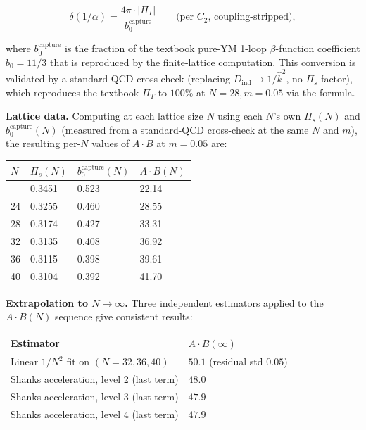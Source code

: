 \documentclass[
]{article}
\begin{document}
\[\delta(1/\alpha) = \frac{4\pi \cdot |\Pi_T|}{b_0^{\text{capture}}} \qquad \text{(per } C_2\text{, coupling-stripped)},\]

where \(b_0^{\text{capture}}\) is the fraction of the textbook pure-YM
1-loop \(\beta\)-function coefficient \(b_0 = 11/3\) that is reproduced
by the finite-lattice computation. This conversion is validated by a
standard-QCD cross-check (replacing \(D_{\text{ind}} \to 1/\hat{k}^2\),
no \(\Pi_s\) factor), which reproduces the textbook \(\Pi_T\) to
\(100\%\) at \(N = 28, m = 0.05\) via the formula.

\textbf{Lattice data.} Computing at each lattice size \(N\) using each
\(N\)'s own \(\Pi_s(N)\) and \(b_0^{\text{capture}}(N)\) (measured from
a standard-QCD cross-check at the same \(N\) and \(m\)), the resulting
per-\(N\) values of \(A \cdot B\) at \(m = 0.05\) are:

\begin{longtable}[]{@{}llll@{}}
\toprule\noalign{}
\(N\) & \(\Pi_s(N)\) & \(b_0^{\text{capture}}(N)\) & \(A \cdot B(N)\) \\
\midrule\noalign{}
\endhead
\bottomrule\noalign{}
\endlastfoot
20 & 0.3451 & 0.523 & 22.14 \\
24 & 0.3255 & 0.460 & 28.55 \\
28 & 0.3174 & 0.427 & 33.31 \\
32 & 0.3135 & 0.408 & 36.92 \\
36 & 0.3115 & 0.398 & 39.61 \\
40 & 0.3104 & 0.392 & 41.70 \\
\end{longtable}

\textbf{Extrapolation to \(N \to \infty\).} Three independent estimators
applied to the \(A \cdot B(N)\) sequence give consistent results:

\begin{longtable}[]{@{}ll@{}}
\toprule\noalign{}
Estimator & \(A \cdot B(\infty)\) \\
\midrule\noalign{}
\endhead
\bottomrule\noalign{}
\endlastfoot
Linear \(1/N^2\) fit on \((N=32,36,40)\) & \(50.1\) (residual std
\(0.05\)) \\
Shanks acceleration, level 2 (last term) & \(48.0\) \\
Shanks acceleration, level 3 (last term) & \(47.9\) \\
Shanks acceleration, level 4 (last term) & \(47.9\) \\
\end{longtable}
\end{document}

